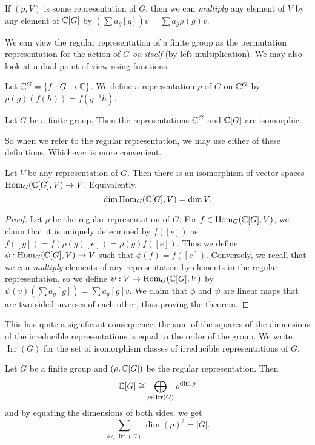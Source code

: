 If $(p, V)$ is some representation of $G$, then we can \emph{multiply} any element of $V$ by any element of $\mathbb{C}[G]$ by $(\sum a_g[g])v = \sum a_g\rho(g)v$.

We can view the regular representation of a finite group as the permutation representation for the action of $G$ \emph{on itself} (by left multiplication). We may also look at a dual point of view using functions.

\begin{definition}
  Let $\mathbb{C}^G = \{f: G \to \mathbb{C}\}$. We define a representation $\rho$ of $G$ on $\mathbb{C}^G$ by $\rho(g)(f(h)) = f(g^{-1}h)$.
\end{definition}

\begin{lemma}
  Let $G$ be a finite group. Then the representations $\mathbb{C}^G$ and $\mathbb{C}[G]$ are isomorphic.
\end{lemma}

So when we refer to the regular representation, we may use either of these definitions. Whichever is more convenient.

\begin{theorem}
  Let $V$ be any representation of $G$. Then there is an isomorphism of vector spaces $\operatorname{Hom}_G(\mathbb{C}[G], V) \to V$. Equivalently, \[\dim \operatorname{Hom}_G(\mathbb{C}[G], V) = \dim V.\]
\end{theorem}

\begin{proof}
  Let $\rho$ be the regular representation of $G$. For $f \in \operatorname{Hom}_G(\mathbb{C}[G], V)$, we claim that it is uniquely determined by $f([e])$ as $f([g]) = f(\rho(g)[e]) = \rho(g)f([e])$. Thus we define $\phi: \operatorname{Hom}_G(\mathbb{C}[G], V) \to V$ such that $\phi(f) = f([e])$. Conversely, we recall that we can \emph{multiply} elements of any representation by elements in the regular representation, so we define $\psi: V \to \operatorname{Hom}_G(\mathbb{C}[G], V)$ by $\psi(v)(\sum a_g[g]) = \sum a_g[g]v$. We claim that $\phi$ and $\psi$ are linear maps that are two-sided inverses of each other, thus proving the theorem.
\end{proof}

This has quite a significant consequence: the sum of the squares of the dimensions of the irreducible representations is equal to the order of the group. We write $\operatorname{Irr}(G)$ for the set of isomorphism classes of irreducible representations of $G$.

\begin{theorem}
  Let $G$ be a finite group and $(\rho, \mathbb{C}[G])$ be the regular representation. Then
  \[\mathbb{C}[G] \cong \bigoplus_{\rho \in \operatorname{Irr}(G)} \rho^{\dim \rho}\]
  and by equating the dimensions of both sides, we get
  \[\sum_{\rho \in \operatorname{Irr}(G)} \dim(\rho)^2 = \lvert G \rvert.\]
\end{theorem}

